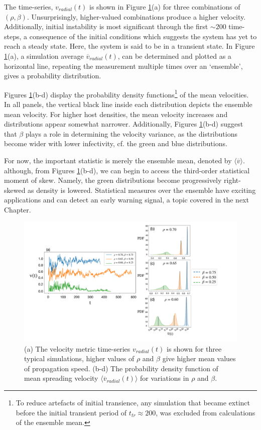 The time-series, $v_{radial}(t)$ is shown in Figure \ref{fig:vel_eff_rad_metric}(a) for three combinations of $(\rho, \beta)$.
Unsurprisingly, higher-valued combinations produce a higher velocity.
Additionally, initial instability is most significant through the first $\sim 200$ time-steps, a consequence of the initial conditions which suggests the system has yet to reach a steady state.
Here, the system is said to be in a transient state.
In Figure \ref{fig:vel_eff_rad_metric}(a), a simulation average $\overline{v}_{radial}(t)$, 
can be determined and plotted as a horizontal line, repeating the measurement multiple times over an `ensemble', gives a probability distribution. 

Figures \ref{fig:vel_eff_rad_metric}(b-d) display the probability density functions\footnote{
To reduce artefacts of initial transience, any simulation that became extinct before the initial transient period 
of $t_{tr}\approx 200$, was excluded from calculations of the ensemble mean.} of the mean velocities.
In all panels, the vertical black line inside each distribution depicts the ensemble mean velocity.
For higher host densities, the mean velocity increases and distributions appear somewhat narrower.
Additionally, Figures \ref{fig:vel_eff_rad_metric}(b-d) suggest that $\beta$ plays a role in determining the velocity variance, as the distributions become wider with lower infectivity, cf. the green and blue distributions.

For now, the important statistic is merely the ensemble mean, denoted by $\big\langle\overline{v}\big\rangle$.
although, from Figures \ref{fig:vel_eff_rad_metric}(b-d), we can begin to access the third-order statistical moment of skew.
Namely, the green distributions become progressively right-skewed as density is lowered.
Statistical measures over the ensemble have exciting applications and can detect an early warning signal, a topic covered in the next Chapter.

\begin{figure}
    \centering
    \includegraphics[scale=0.26]{chapter3/figures/figure7.pdf}
    \caption{(a) The velocity metric time-series $v_{radial}(t)$ is shown for three typical simulations, higher values of $\rho$ and $\beta$ give higher mean values of propagation speed. (b-d) The probability density function of mean spreading velocity $\big\langle \overline{v}_{radial}(t) \big\rangle$ for variations in $\rho$ and $\beta$.}
    \label{fig:vel_eff_rad_metric}
\end{figure}

